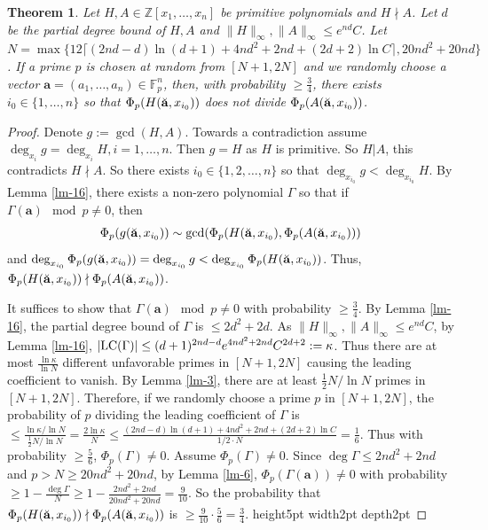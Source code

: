 \documentclass[final,20pt]{elsarticle}
\newtheorem{theorem}{Theorem}[section]
\def\Z{{\mathbb Z}}
\def\F{{\mathbb{F}}}
\def\LC{\hbox{\rm{LC}}}
\def\qed{\hfil {\vrule height5pt width2pt depth2pt}}
\begin{document}
\begin{theorem}\label{the-4}
Let $H,A\in \Z[x_1,\dots,x_n]$ be primitive polynomials and $H\nmid A$.  Let $d$ be the partial degree bound of $H,A$ and $\|H\|_{\infty},\|A\|_{\infty}\leq e^{nd}C$. Let $N=\max\{ 12\lceil(2nd-d)\ln(d+1)+4nd^2+2nd+(2d+2)\ln C\rceil,20nd^2+20nd\}$. If a prime $p$ is chosen at random from $[N+1,2N]$ and we randomly choose a vector $\mathbf{a}=(a_1,\dots,a_{n})\in \F_p^{n}$, then, with probability $\geq \frac{3}{4}$, there exists $i_0\in \{1,\dots,n\}$ so that $\Phi_p(H(\Breve{\mathbf{a}},x_{i_0}))$ does not divide $\Phi_p(A(\Breve{\mathbf{a}},x_{i_0}))$.
\end{theorem}

\begin{proof}
Denote $g:=\gcd(H,A)$. Towards a contradiction assume $\deg_{x_i}g=\deg_{x_i}H,i=1,\dots,n$. Then $g=H$ as $H$ is primitive. So $H|A$, this contradicts $H\nmid A$. So there exists $i_0\in \{1,2,\dots,n\}$ so that $\deg_{x_{i_0}}g<\deg_{x_{i_0}}H$. By Lemma \ref{lm-16}, there exists a non-zero polynomial $\Gamma$
so that if $\Gamma(\mathbf{a}) \mod p\neq 0$, then $$\Phi_p(g(\Breve{\mathbf{a}},x_{i_0})) \sim\gcd(\Phi_p(H(\Breve{\mathbf{a}},x_{i_0}),\Phi_p(A(\Breve{\mathbf{a}},x_{i_0})))$$ and $\deg_{x_{i_0}}\Phi_p(g(\Breve{\mathbf{a}},x_{i_0}))=\deg_{x_{i_0}}g<\deg_{x_{i_0}}\Phi_p(H(\Breve{\mathbf{a}},x_{i_0}))$. Thus, $\Phi_p(H(\Breve{\mathbf{a}},x_{i_0})) \nmid \Phi_p(A(\Breve{\mathbf{a}},x_{i_0}))$.


It suffices to show that $\Gamma(\mathbf{a}) \mod p\neq 0$ with probability  $\geq \frac{3}{4}$. By Lemma \ref{lm-16}, the partial degree bound of $\Gamma$ is $\leq 2d^2+2d$.
%
As $\|H\|_{\infty},\|A\|_{\infty}\leq e^{nd}C$, by Lemma \ref{lm-16}, $|\LC(\Gamma)|\leq (d+1)^{2nd-d}e^{4nd^2+2nd}C^{2d+2}:=\kappa$.
%
%
Thus there are at most $\frac{\ln \kappa}{\ln N}$ different unfavorable primes in $[N+1,2N]$ causing the leading coefficient to vanish.
%
By Lemma \ref{lm-3}, there are at least $\frac{1}{2}N/\ln N$ primes in $[N+1,2N]$.
%
Therefore, if we randomly choose a prime $p$ in $[N+1,2N]$, the probability of $p$ dividing the leading coefficient of $\Gamma$ is $\leq \frac{\ln \kappa/\ln N}{\frac{1}{2}N/\ln N}=\frac{2\ln \kappa}{N}\leq \frac{(2nd-d)\ln(d+1)+4nd^2+2nd+(2d+2)\ln C}{1/2\cdot N}=\frac16$.
%
Thus with probability $\geq \frac56$, $\Phi_p(\Gamma)\neq0$. Assume $\Phi_p(\Gamma)\neq0$.  Since $\deg \Gamma\leq 2nd^2+2nd$ and $p>N\geq 20nd^2+20nd$, by Lemma \ref{lm-6}, $\Phi_p(\Gamma(\mathbf{a}))\neq0$ with probability $\geq 1-\frac{\deg \Gamma}{N}\geq 1-\frac{2nd^2+2nd}{20nd^2+20nd}=\frac{9}{10}$.
%
So the probability that $\Phi_p(H(\Breve{\mathbf{a}},x_{i_0}))\nmid\Phi_p(A(\Breve{\mathbf{a}},x_{i_0}))$ is $\geq \frac{9}{10}\cdot \frac{5}{6}=\frac{3}{4}$.
\qed
\end{proof}
\end{document}
